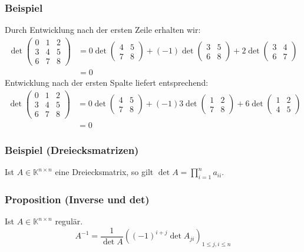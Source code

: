 \subsubsection{Beispiel}
Durch Entwicklung nach der ersten Zeile erhalten wir:
\begin{align*}
\det \begin{pmatrix}0 & 1 & 2\\ 3 & 4 & 5\\ 6 & 7 & 8\end{pmatrix}&=0\det \begin{pmatrix}4 & 5\\ 7 & 8\end{pmatrix}+(-1)\det \begin{pmatrix}3 & 5\\ 6 & 8\end{pmatrix}+2\det \begin{pmatrix}3 & 4\\ 6 & 7\end{pmatrix}\\
&=0
\end{align*}
Entwicklung nach der ersten Spalte liefert entsprechend:
\begin{align*}
\det \begin{pmatrix}0 & 1 & 2\\ 3 & 4 & 5\\ 6 & 7 & 8\end{pmatrix}&=0\det \begin{pmatrix}4 & 5\\ 7 & 8\end{pmatrix}+(-1)3\det \begin{pmatrix}1 & 2\\ 7 & 8\end{pmatrix}+6\det \begin{pmatrix}1 & 2\\ 4 & 5\end{pmatrix}\\
&=0
\end{align*}
\subsubsection{Beispiel (Dreiecksmatrizen)}
Ist $A\in\mathbb{K}^{n\times n}$ eine Dreiecksmatrix, so gilt $\det A=\prod _{i=1}^n a_{ii}$.
\subsubsection{Proposition (Inverse und det)}
Ist $A\in\mathbb{K}^{n\times n}$ regulär.
\[A^{-1}=\frac{1}{\det A}\left( (-1)^{i+j}\det A_{ji}\right)_{1\leq j,i\leq n}\]
